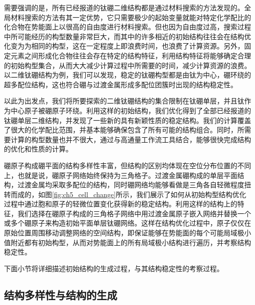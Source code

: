 需要强调的是，所有已经报道的钛硼二维结构都是通过材料搜索的方法发现的。全局材料搜索的方法有其一定优势，它只需要极少的起始变量就能对特定化学配比的化合物在势能面上以很高的自由度进行材料搜索。但也因为自由度过高，搜索过程中所可能经历的构型数量非常巨大，而其中的许多相近的初始结构往往会在结构优化变为为相同的构型，这在一定程度上即浪费时间，也浪费了计算资源。另外，固定元素之间形成化合物往往会存在特定的结构特征，利用结构特征将能够确定合理的初始构型集合，从而大大减少计算过程中所需要的时间，减少计算资源的浪费。以二维钛硼结构为例，我们可以发现，稳定的钛硼构型都是由钛为中心，硼环绕的超多配位结构，这也符合硼与过渡金属形成多配位团簇时出现的结构稳定性。

以此为出发点，我们将所要探索的二维钛硼结构的集合限制在钛硼单层，并且钛作为中心原子被硼原子环绕。利用这样的初始结构，我们优化得到了全部已经报道的钛硼单层二维结构，并发现了一些新的具有新颖性质的稳定结构。我们的计算覆盖了很大的化学配比范围，并基本能够确保包含了所有可能的结构组合。同时，所需要计算的构型数量也并不很大，通过与高通量工作流工具结合，能够很快完成结构的优化和性质的计算。

硼原子构成硼平面的结构多样性丰富，但结构的区别均体现在空位分布位置的不同上，也就是说，硼原子网络始终保持为三角格子。过渡金属硼构成的单层平面结构，过渡金属均采取多配位的结构，同时硼网络均能够看做是三角各自轻微程度扭转而成的，如图\ref{fig:ch5_cell_change}所示，我们展示了如何从初始构型结构优化过程中通过胞和原子的轻微位置变化获得新的稳定结构。利用这样的结构上的特征，我们选择在硼原子构成的三角格子网络中用过渡金属原子嵌入网络并替换一个或多个硼原子来构造初始平面单层钛硼网络。这样在结构优化过程中，原子仅仅在原始位置周围移动调整网络的空间结构，即保证能够在势能面的每个可能局域极小值附近都有初始构型，从而对势能面上的所有局域极小结构进行遍历，并考察结构稳定性。

下面小节将详细描述初始结构的生成过程，与其结构稳定性的考察过程。

\subsection{结构多样性与结构的生成}

